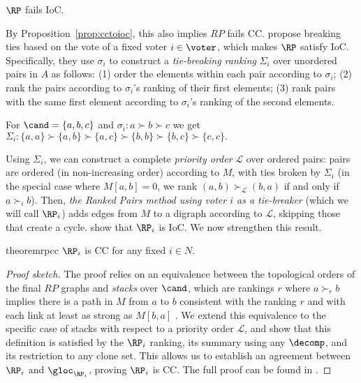 \begin{proposition}\label{prop:rpfailioc}
        $\RP$ fails IoC.
\end{proposition}

By Proposition~\ref{prop:cctoioc}, this also implies $RP$ fails CC. \citet{Zavist89:Complete} propose breaking ties based on the vote of a fixed voter $i \in \voter$, which makes $\RP$ satisfy IoC.  
Specifically, they use $\sigma_i$ to construct a \emph{tie-breaking ranking} $\Sigma_i$ over unordered pairs in $A$ as follows: (1) order the elements within each pair according to $\sigma_i$; (2) rank the pairs according to $\sigma_i$'s ranking of their first elements; (3) rank pairs with the same first element according to $\sigma_i$'s ranking of the second elements. 
\begin{example}
    For $\cand=\{a,b,c\}$ and $\sigma_i: a\succ b \succ c $ we get
      $\Sigma_i: \{a,a\}\succ\{a,b\}\succ\{a,c\} \succ\{b,b\}\succ \{b,c\}\succ\{c,c\}.$
\end{example}

Using $\Sigma_i$, we can construct a complete \emph{priority order} $\mathcal{L}$ over ordered pairs: pairs are ordered (in non-increasing order) according to $M$, with ties broken by $\Sigma_i$ (in the special case where $M[a,b]=0$, we rank $(a,b) \succ_{\mathcal{L}} (b,a)$ if and only if $a \succ_i b$). Then, \textit{the Ranked Pairs method using voter $i$ as a tie-breaker} (which we will call $\RP_i$) adds edges from $M$ to a digraph according to $\mathcal{L}$, skipping those that create a cycle. \citet{Zavist89:Complete} show that $\RP_i$ is IoC. We now strengthen this result.

\begin{restatable}{theorem}{rpcc}\label{thm:rp}
    $\RP_i$ is CC for any fixed $i \in N$. 
\end{restatable}

\begin{proof}[Proof sketch] The proof relies on an equivalence between the topological orders of the final $RP$ graphs and \emph{stacks} over $\cand$, which are rankings $r$ where $a\succ_r b$ implies there is a path in $M$ from $a$ to $b$ consistent with the ranking $r$ and with each link at least as strong as $M[b,a]$ \citep{Zavist89:Complete}. We extend this equivalence to the specific case of stacks with respect to a priority order $\mathcal{L}$, and show that this definition is satisfied by the $\RP_i$ ranking, its summary using any $\decomp $, and its restriction to any clone set. This allows us to establish an agreement between $\RP_i$ and $\gloc_{\RP_i}$, proving $\RP_i$ is CC. The full proof can be found in .
\end{proof}

